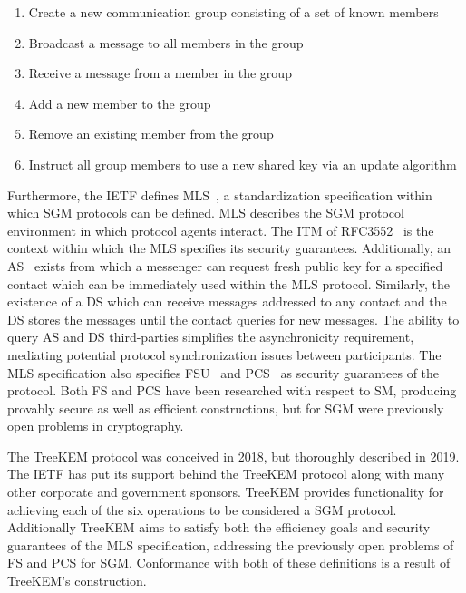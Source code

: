 \documentclass[runningheads]{llncs}
\newcommand{\Abrev}[1]{\gls{#1}}
\begin{document}
\begin{enumerate}
\item Create a new communication group consisting of a set of known members
\item Broadcast a message to all members in the group
\item Receive a message from a member in the group
\item Add a new member to the group
\item Remove an existing member from the group
\item Instruct all group members to use a new shared key via an update algorithm
\end{enumerate}

Furthermore, the \Abrev{IETF} defines \Abrev{MLS}~\cite{Omara2020}, a standardization specification within which \Abrev{SGM} protocols can be defined.
\Abrev{MLS} describes the \Abrev{SGM} protocol environment in which protocol agents interact.
The \Abrev{ITM} of RFC3552~\cite{rescorla2003rfc3552} is the context within which the \Abrev{MLS} specifies its security guarantees.
Additionally, an \Abrev{AS}~\cite{perlman1999overview} exists from which a messenger can request fresh public key for a specified contact which can be immediately used within the \Abrev{MLS} protocol.
Similarly, the existence of a \Abrev{DS} which can receive messages addressed to any contact and the \Abrev{DS} stores the messages until the contact queries for new messages.
The ability to query \Abrev{AS} and \Abrev{DS} third-parties simplifies the asynchronicity requirement, mediating potential protocol synchronization issues between participants.
The \Abrev{MLS} specification also specifies \Abrev{FSU}~\cite{Omara2020} and \Abrev{PCS}~\cite{cohn2016post} as security guarantees of the protocol.
Both \Abrev{FS} and \Abrev{PCS} have been researched with respect to \Abrev{SM}, producing provably secure as well as efficient constructions, but for \Abrev{SGM} were previously open problems in cryptography.

The TreeKEM protocol \cite{bhargavan:hal-02425247} was conceived in 2018, but thoroughly described in 2019.
The \Abrev{IETF} has put its support behind the TreeKEM protocol along with many other corporate and government sponsors.
TreeKEM provides functionality for achieving each of the six operations to be considered a \Abrev{SGM} protocol.
Additionally TreeKEM aims to satisfy both the efficiency goals and security guarantees of the \Abrev{MLS} specification, addressing the previously open problems of \Abrev{FS} and \Abrev{PCS} for \Abrev{SGM}.
Conformance with both of these definitions is a result of TreeKEM's construction.
\end{document}
